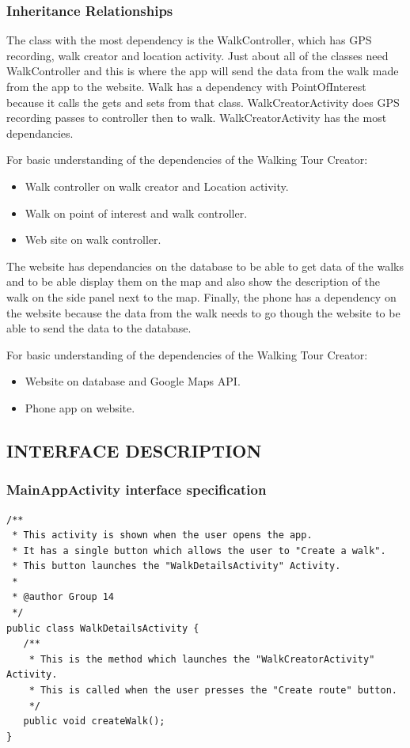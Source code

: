 \documentclass{project}
\begin{document}
\newpage

\subsubsection{Inheritance Relationships}
The class with the most dependency is the WalkController, which has GPS
recording, walk creator and location activity. Just about all of the classes
need WalkController and this is where the app will send the data from the walk
made from the app to the website. Walk has a dependency with PointOfInterest
because it calls the gets and sets from that class. WalkCreatorActivity does GPS recording passes to controller then to walk. WalkCreatorActivity has the most dependancies.

For basic understanding of the dependencies of the Walking Tour Creator:
\begin{itemize}
\item Walk controller on walk creator and Location activity.
\item Walk on point of interest and walk controller.
\item Web site on walk controller.
\end{itemize}

The website has dependancies on the database to be able to get data of the
walks and to be able display them on the map and also show the description of
the walk on the side panel next to the map. Finally, the phone has a dependency
on the website because the data from the walk needs to go though the website to
be able to send the data to the database.      

For basic understanding of the dependencies of the Walking Tour Creator:
\begin{itemize}
\item Website on database and Google Maps API.
\item Phone app on website. 
\end{itemize}

\newpage

\subsection{INTERFACE DESCRIPTION}
\subsubsection{MainAppActivity interface specification}
\begin{verbatim}/**
 * This activity is shown when the user opens the app.
 * It has a single button which allows the user to "Create a walk". 
 * This button launches the "WalkDetailsActivity" Activity.
 *
 * @author Group 14
 */
public class WalkDetailsActivity {
   /**
    * This is the method which launches the "WalkCreatorActivity" Activity.
    * This is called when the user presses the "Create route" button.
    */
   public void createWalk();
}\end{verbatim}
\end{document}
